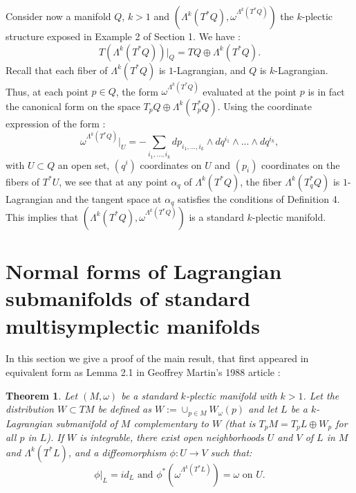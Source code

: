 \documentclass[a4paper,12pt,leqno]{article}
\newtheorem{thm}{Theorem}
\begin{document}
 Consider now a manifold $Q$, $k>1$ and $(\Lambda^k(T^*Q),\omega^{\Lambda^k(T^*Q)})$ the $k$-plectic 
structure exposed in Example 2 of Section 1. We have :
\begin{equation*}
T(\Lambda^k(T^*Q))|_Q=TQ\oplus \Lambda^k(T^*Q).
\end{equation*}
Recall that each fiber of $\Lambda^k(T^*Q)$ is $1$-Lagrangian, and $Q$ is $k$-Lagrangian. Thus, at each point $p\in Q$, the form 
$\omega^{\Lambda^k(T^*Q)}$ evaluated at the point $p$ is in fact the canonical form on the space $T_pQ\oplus \Lambda^k(T_p^*Q)$. Using the coordinate expression of the form :
\begin{equation*}
\omega^{\Lambda^k(T^*Q)}|_U=- \sum_{i_1,...,i_k} dp_{i_1,...,i_k}\wedge dq^{i_1}\wedge...\wedge dq^{i_k},
\end{equation*}
with $U\subset Q$ an open set, $(q^i)$ coordinates on $U$ and $(p_i)$ coordinates on the fibers of $T^*U$, we see that 
at any point $\alpha_q$ of 
$\Lambda^k(T^*Q)$, the fiber $\Lambda^k(T_q^*Q)$ is $1$-Lagrangian and the tangent space at $\alpha_q$
satisfies the conditions of Definition 4. This implies that 
$(\Lambda^k(T^*Q),\omega^{\Lambda^k(T^*Q)})$ is a standard $k$-plectic manifold. 




\section{Normal forms of Lagrangian submanifolds of standard multisymplectic manifolds}



In this section we give a proof of the main result, that first appeared in equivalent form  as Lemma 2.1 
in Geoffrey Martin's 1988 article \cite{Martin1988}:


\begin{thm}
Let $(M,\omega)$ be a standard $k$-plectic manifold with $k>1$. Let the
distribution $W\subset TM$ be defined as  $W:=\cup_{p\in M} W_{\omega}(p)$ and let $L$ be a $k$-Lagrangian 
submanifold of $M$ complementary to $W$ (that is $T_pM=T_pL\oplus W_p$ for all $p$ in $L$).
If $W$ is integrable, there exist open neighborhoods $U$ and $V$ of $L$ in $M$ 
and $\Lambda^k(T^{*}L)$, and a diffeomorphism $\phi:U\rightarrow V$ such that:
\begin{equation*}
\phi|_{L}=id_{L}   \,\, \mbox{and} \,\,  \phi^{*}(\omega^{\Lambda^k(T^{*}L)})=\omega \,\, \mbox{on} \, \, U.
\end{equation*}
\end{thm}
\end{document}
